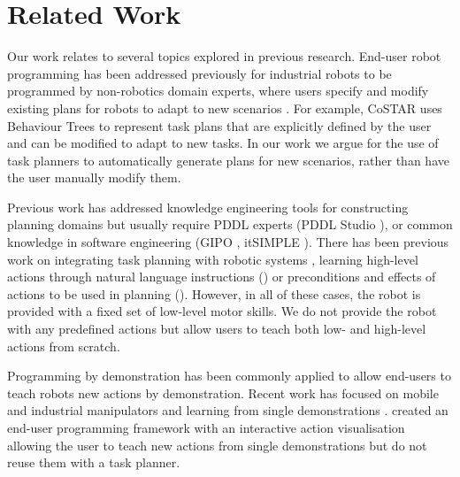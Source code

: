 \section{Related Work}
\label{sec:relatedwork}
Our work relates to several topics explored in previous research.
End-user robot programming has been addressed previously for industrial robots to be programmed by non-robotics domain experts, where users specify and modify existing plans for robots to adapt to new scenarios \cite{paxton2017costar,perzylo2016intuitive,stenmark2017simplified}.
For example, CoSTAR \citet{paxton2017costar} uses Behaviour Trees to represent task plans that are explicitly defined by the user and can be modified to adapt to new tasks.
In our work we argue for the use of task planners to automatically generate plans for new scenarios, rather than have the user manually modify them.

Previous work has addressed knowledge engineering tools for constructing planning domains but usually require PDDL experts (PDDL Studio \cite{plch2012inspect}), or common knowledge in software engineering (GIPO \cite{simpson2007planning}, itSIMPLE \cite{vaquero2013itsimple}).
There has been previous work on integrating task planning with robotic systems \cite{cashmore2015rosplan,kuhner2018closed}, learning high-level actions through natural language instructions (\cite{she2014teaching}) or preconditions and effects of actions to be used in planning (\cite{jetchev2013learning,konidaris2018fromSkills,ugur2015bottom}).
However, in all of these cases, the robot is provided with a fixed set of low-level motor skills.
We do not provide the robot with any predefined actions but allow users to teach both low- and high-level actions from scratch.

Programming by demonstration \cite{argall2009survey,billard2008robot} has been commonly applied to allow end-users to teach robots new actions by demonstration.
Recent work has focused on mobile and industrial manipulators \cite{pedersen2014intuitive,huang2017code3,stenmark2017simplified} and learning from single demonstrations \cite{perez2017c,wu2010towards,yu2018one,tremblay2018synthetically}.
\citet{alexandrova2014robot} created an end-user programming framework with an interactive action visualisation allowing the user to teach new actions from single demonstrations but do not reuse them with a task planner.

